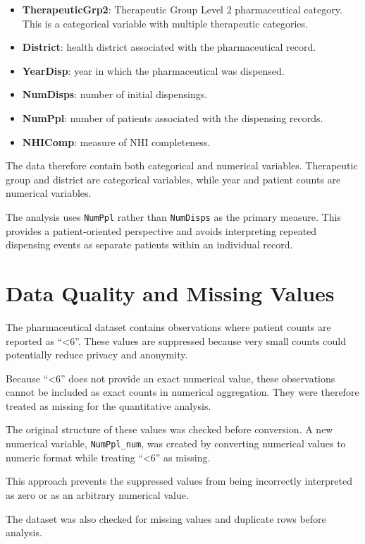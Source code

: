 \documentclass[11pt,a4paper]{report}
\begin{document}
\begin{itemize}
    \item \textbf{TherapeuticGrp2}: Therapeutic Group Level 2 pharmaceutical category. This is a categorical variable with multiple therapeutic categories.
    \item \textbf{District}: health district associated with the pharmaceutical record.
    \item \textbf{YearDisp}: year in which the pharmaceutical was dispensed.
    \item \textbf{NumDisps}: number of initial dispensings.
    \item \textbf{NumPpl}: number of patients associated with the dispensing records.
    \item \textbf{NHIComp}: measure of NHI completeness.
\end{itemize}

The data therefore contain both categorical and numerical variables. Therapeutic group and district are categorical variables, while year and patient counts are numerical variables.

The analysis uses \texttt{NumPpl} rather than \texttt{NumDisps} as the primary measure. This provides a patient-oriented perspective and avoids interpreting repeated dispensing events as separate patients within an individual record.


\section{Data Quality and Missing Values}

The pharmaceutical dataset contains observations where patient counts are reported as ``<6''. These values are suppressed because very small counts could potentially reduce privacy and anonymity.

Because ``<6'' does not provide an exact numerical value, these observations cannot be included as exact counts in numerical aggregation. They were therefore treated as missing for the quantitative analysis.

The original structure of these values was checked before conversion. A new numerical variable, \texttt{NumPpl\_num}, was created by converting numerical values to numeric format while treating ``<6'' as missing.

This approach prevents the suppressed values from being incorrectly interpreted as zero or as an arbitrary numerical value.

The dataset was also checked for missing values and duplicate rows before analysis.
\end{document}
